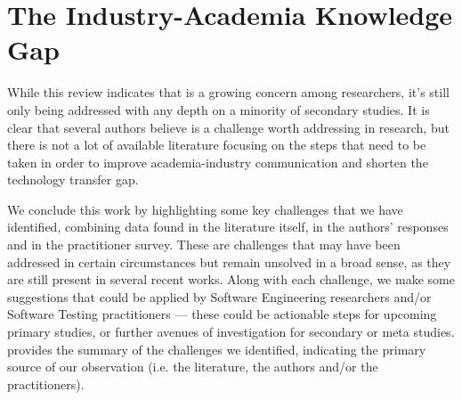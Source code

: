 \chapter{The Industry-Academia Knowledge Gap}\label{chap:gap}

While this review indicates that \rea is a growing concern among \rt researchers, it's still only being addressed with any depth on a minority of secondary studies.
It is clear that several authors believe \rea is a challenge worth addressing in research, but there is not a lot of available \rt literature focusing on the steps that need to be taken in order to improve academia-industry communication and shorten the technology transfer gap.

We conclude this work by highlighting some key challenges that we have identified, combining data found in the literature itself, in the authors' responses and in the practitioner survey.
These are challenges that may have been addressed in certain circumstances but remain unsolved in a broad sense, as they are still present in several recent works.
Along with each challenge, we make some suggestions that could be applied by Software Engineering researchers and/or Software Testing practitioners — these could be actionable steps for upcoming primary studies, or further avenues of investigation for secondary or meta studies.
 provides the summary of the challenges we identified, indicating the primary source of our observation (i.e. the literature, the authors and/or the practitioners).

